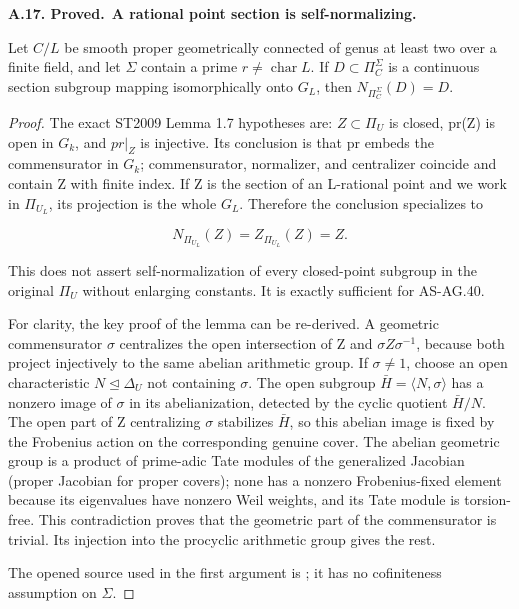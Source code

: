 \documentclass[11pt,a4paper]{article}
\newenvironment{claim}[3]{\par\medskip\noindent\hypertarget{#1}{\textbf{#1. #2.}}\ \textbf{#3.}\par\nopagebreak\smallskip\begingroup\itshape}{\endgroup\par\smallskip}
\begin{document}
\begin{claim}{A.17}{Proved}{A rational point section is self-normalizing}

Let $C/L$ be smooth proper geometrically connected of genus at least
two over a finite field, and let $\Sigma$ contain a prime
$r\ne\operatorname{char}L$. If $D\subset\Pi_C^\Sigma$
is a continuous section subgroup mapping isomorphically onto $G_L$,
then $N_{\Pi_C^\Sigma}(D)=D$.

\end{claim}

\begin{proof}

The exact ST2009 Lemma 1.7 hypotheses are: \(Z{\subset}{\Pi}_U\) is closed, pr(Z) is open in \(G_k\), and \(pr|_Z\) is injective. Its conclusion is that pr embeds the commensurator in \(G_k\); commensurator, normalizer, and centralizer coincide and contain Z with finite index. If Z is the section of an L-rational point and we work in \({\Pi}_{U_L}\), its projection is the whole \(G_L\). Therefore the conclusion specializes to

\[N_{\Pi_{U_L}}(Z)=Z_{\Pi_{U_L}}(Z)=Z.\]

This does not assert self-normalization of every closed-point subgroup in the original \({\Pi}_U\) without enlarging constants. It is exactly sufficient for AS-AG.40.

For clarity, the key proof of the lemma can be re-derived. A geometric commensurator \({\sigma}\) centralizes the open intersection of Z and \({\sigma}Z{\sigma}^{-1}\), because both project injectively to the same abelian arithmetic group. If \({\sigma}{\ne}1\), choose an open characteristic \(N{\trianglelefteq}{\Delta}_U\) not containing \({\sigma}\). The open subgroup \(\bar H=\langle N,\sigma\rangle\) has a nonzero image of \({\sigma}\) in its abelianization, detected by the cyclic quotient \(\bar H/N\). The open part of Z centralizing \({\sigma}\) stabilizes \(\bar H\), so this abelian image is fixed by the Frobenius action on the corresponding genuine cover. The abelian geometric group is a product of prime-adic Tate modules of the generalized Jacobian (proper Jacobian for proper covers); none has a nonzero Frobenius-fixed element because its eigenvalues have nonzero Weil weights, and its Tate module is torsion-free. This contradiction proves that the geometric part of the commensurator is trivial. Its injection into the procyclic arithmetic group gives the rest.

The opened source used in the first argument is
\cite[Lemma 1.7]{LA_ST2009}; it has no cofiniteness assumption on \(\Sigma\).


\end{proof}
\end{document}
